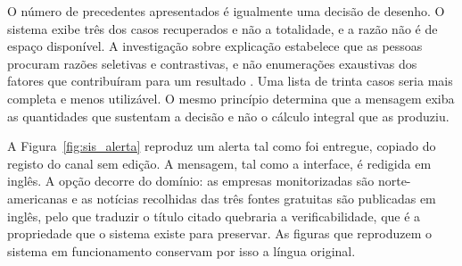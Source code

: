 O número de precedentes apresentados é igualmente uma decisão de desenho. O sistema exibe três dos
casos recuperados e não a totalidade, e a razão não é de espaço disponível. A investigação sobre
explicação estabelece que as pessoas procuram razões seletivas e contrastivas, e não enumerações
exaustivas dos fatores que contribuíram para um resultado \autocite{miller2019explanation}. Uma
lista de trinta casos seria mais completa e menos utilizável. O mesmo princípio determina que a
mensagem exiba as quantidades que sustentam a decisão e não o cálculo integral que as produziu.

A Figura~\ref{fig:sis_alerta} reproduz um alerta tal como foi entregue, copiado do registo do
canal sem edição. A mensagem, tal como a interface, é redigida em inglês. A opção decorre do
domínio: as empresas monitorizadas são norte-americanas e as notícias recolhidas das três fontes
gratuitas são publicadas em inglês, pelo que traduzir o título citado quebraria a verificabilidade,
que é a propriedade que o sistema existe para preservar. As figuras que reproduzem o sistema em
funcionamento conservam por isso a língua original.

